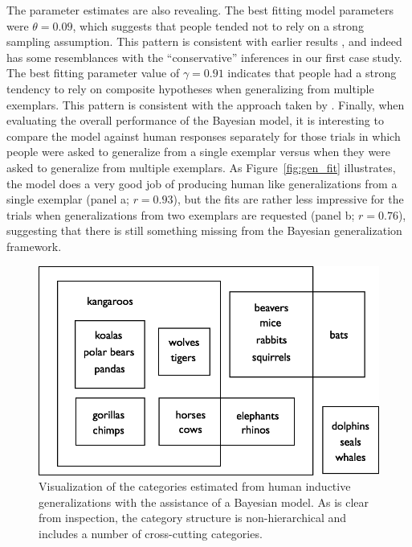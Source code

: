 \documentclass[doc,floatsintext]{apa6}
\begin{document}
The parameter estimates are also revealing. The best fitting model parameters were $\theta=0.09$, which suggests that people tended not to rely on a strong sampling assumption. This pattern is consistent with earlier results \cite{navarro2012,RansomINPRESS}, and indeed has some resemblances with the ``conservative'' inferences in our first case study. The best fitting parameter value of $\gamma=0.91$ indicates that people had a strong tendency to rely on composite hypotheses when generalizing from multiple exemplars. This pattern is consistent with the approach taken by . Finally, when evaluating the overall performance of the Bayesian model, it is interesting to compare the model against human responses separately for those trials in which people were asked to generalize from a single exemplar versus when they were asked to generalize from multiple exemplars. As Figure~\ref{fig:gen_fit} illustrates, the model does a very good job of producing human like generalizations from a single exemplar (panel a; $r=0.93$), but the fits are rather less impressive for the trials when generalizations from two exemplars are requested (panel b; $r=0.76$), suggesting that there is still something missing from the Bayesian generalization framework.

\begin{figure}[p]
\begin{center}
\bigskip
\includegraphics[width=.6\textwidth]{generalization_figs/hypotheses.png}
\bigskip
\caption{Visualization of the categories estimated from human inductive generalizations with the assistance of a Bayesian model. As is clear from inspection, the category structure is non-hierarchical and includes a number of cross-cutting categories.}
\label{fig:hypothesis_space}
\end{center}
\end{figure}
\end{document}
